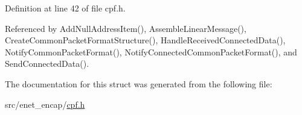 \-Definition at line 42 of file cpf.\-h.



\-Referenced by \-Add\-Null\-Address\-Item(), \-Assemble\-Linear\-Message(), \-Create\-Common\-Packet\-Format\-Structure(), \-Handle\-Received\-Connected\-Data(), \-Notify\-Common\-Packet\-Format(), \-Notify\-Connected\-Common\-Packet\-Format(), and \-Send\-Connected\-Data().



\-The documentation for this struct was generated from the following file\-:\begin{DoxyCompactItemize}
\item 
src/enet\-\_\-encap/\hyperlink{cpf_8h}{cpf.\-h}\end{DoxyCompactItemize}
